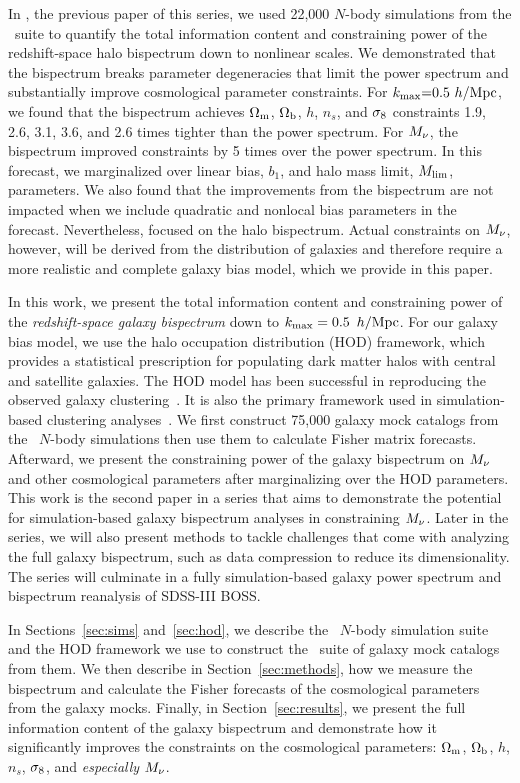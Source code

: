In \cite{hahn2020}, the previous paper of this series, we used 22,000 $N$-body
simulations from the \quij~suite to quantify the total information content and
constraining power of the redshift-space halo bispectrum down to nonlinear scales. 
We demonstrated that the bispectrum breaks parameter degeneracies that limit
the power spectrum and substantially improve cosmological parameter constraints.
For $k_{\rm max}{=}0.5~h/{\rm Mpc}$, we found that the bispectrum achieves $\Omega_{\rm m}$,
$\Omega_{\rm b}$, $h$, $n_s$, and $\sigma_8$ constraints 1.9, 2.6, 3.1, 3.6, and 2.6 times
tighter than the power spectrum. For $M_\nu$, the bispectrum improved 
constraints by 5 times over the power spectrum. In this forecast, we marginalized 
over linear bias, $b_1$, and halo mass limit, $M_{\rm lim}$, parameters. We also found that the
improvements from the bispectrum are not impacted when we include quadratic 
and nonlocal bias parameters in the forecast. Nevertheless, \cite{hahn2020}
focused on the halo bispectrum. Actual constraints on $M_\nu$, however, will be 
derived from the distribution of galaxies and therefore require a more 
realistic and complete galaxy bias model, which we provide in this paper.

In this work, we present the total information content and constraining power
of the {\em redshift-space galaxy bispectrum} down to $k_{\rm max}= 0.5~\,h/\mathrm{Mpc}$. For our galaxy
bias model, we use the halo occupation distribution (HOD) framework, which provides a
statistical prescription for populating dark matter halos with central and satellite
galaxies. The HOD model has been successful in reproducing the observed galaxy
clustering~\citep[\emph{e.g.}][]{zheng2005, leauthaud2012, tinker2013, zentner2016, vakili2019}. 
It is also the primary framework used in simulation-based clustering
analyses~\citep[\eg][]{mcclintock2018, zhai2019, lange2019, wibking2019}. 
We first construct 75,000 galaxy mock catalogs from the \quij~$N$-body
simulations then use them to calculate Fisher matrix forecasts. Afterward, we
present the constraining power of the galaxy bispectrum on $M_\nu$ and other 
cosmological parameters after marginalizing over the HOD parameters. This work
is the second paper in a series that aims to demonstrate the potential for
simulation-based galaxy bispectrum analyses in constraining $M_\nu$. Later in
the series, we will also present methods to tackle challenges that come with
analyzing the full galaxy bispectrum, such as data compression to reduce its
dimensionality. The series will culminate in a fully simulation-based galaxy
power spectrum and bispectrum reanalysis of SDSS-III BOSS. 

In Sections~\ref{sec:sims} and~\ref{sec:hod}, we describe the \quij~$N$-body simulation 
suite and the HOD framework we use to construct the \molino~suite of galaxy mock 
catalogs from them.  We then describe in Section~\ref{sec:methods}, how we measure the bispectrum and
calculate the Fisher forecasts of the cosmological parameters from the galaxy
mocks. Finally, in Section~\ref{sec:results}, we present the full information
content of the galaxy bispectrum and demonstrate how it significantly improves
the constraints on the cosmological parameters: $\Omega_{\rm m}$, $\Omega_{\rm b}$, $h$, $n_s$,
$\sigma_8$, and {\em especially} $M_\nu$. 
